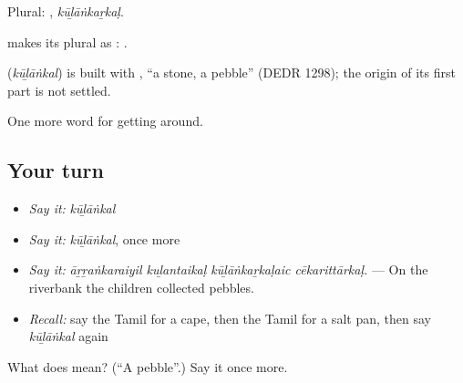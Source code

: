 Plural: , \emph{kūḻāṅkaṟkaḷ}.

 makes its plural as : .

\begin{cousinweb}
\textbf{} (\emph{kūḻāṅkal}) is built with , \textquotedblleft{}a stone, a pebble\textquotedblright{} (DEDR 1298); the origin of its first part is not settled.
\end{cousinweb}

\begin{grammarlens}[title={What you've built}]
One more word for getting around.
\end{grammarlens}

\subsection*{Your turn}
\begin{itemize}
\raggedright
  \item \emph{Say it:} \emph{kūḻāṅkal}
  \item \emph{Say it:} \emph{kūḻāṅkal}, once more
  \item \emph{Say it:} \emph{āṟṟaṅkaraiyil kuḻantaikaḷ kūḻāṅkaṟkaḷaic cēkarittārkaḷ.} — On the riverbank the children collected pebbles.
  \item \emph{Recall:} say the Tamil for a cape, then the Tamil for a salt pan, then say \emph{kūḻāṅkal} again
\end{itemize}

\begin{tcolorbox}[breakable,colback=teal!4,colframe=teal!35!black,title={Before you move on}]
What does  mean? (\textquotedblleft{}A pebble\textquotedblright{}.) Say it once more.
\end{tcolorbox}
